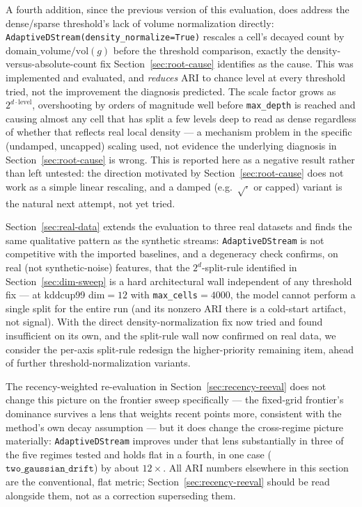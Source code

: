\documentclass[11pt]{article}
\begin{document}
A fourth addition, since the previous version of this evaluation, does address the dense/sparse threshold's lack of volume normalization directly: \texttt{AdaptiveDStream(density\_normalize=True)} rescales a cell's decayed count by \(\text{domain\_volume}/\text{vol}(g)\) before the threshold comparison, exactly the density-versus-absolute-count fix Section~\ref{sec:root-cause} identifies as the cause. This was implemented and evaluated, and \emph{reduces} ARI to chance level at every threshold tried, not the improvement the diagnosis predicted. The scale factor grows as \(2^{d \cdot \text{level}}\), overshooting by orders of magnitude well before \texttt{max\_depth} is reached and causing almost any cell that has split a few levels deep to read as dense regardless of whether that reflects real local density — a mechanism problem in the specific (undamped, uncapped) scaling used, not evidence the underlying diagnosis in Section~\ref{sec:root-cause} is wrong. This is reported here as a negative result rather than left untested: the direction motivated by Section~\ref{sec:root-cause} does not work as a simple linear rescaling, and a damped (e.g.\ \(\sqrt{\cdot}\) or capped) variant is the natural next attempt, not yet tried.

Section~\ref{sec:real-data} extends the evaluation to three real datasets and finds the same qualitative pattern as the synthetic streams: \texttt{AdaptiveDStream} is not competitive with the imported baselines, and a degeneracy check confirms, on real (not synthetic-noise) features, that the \(2^d\)-split-rule identified in Section~\ref{sec:dim-sweep} is a hard architectural wall independent of any threshold fix — at kddcup99 dim$=12$ with \texttt{max\_cells}$=4000$, the model cannot perform a single split for the entire run (and its nonzero ARI there is a cold-start artifact, not signal). With the direct density-normalization fix now tried and found insufficient on its own, and the split-rule wall now confirmed on real data, we consider the per-axis split-rule redesign the higher-priority remaining item, ahead of further threshold-normalization variants.

The recency-weighted re-evaluation in Section~\ref{sec:recency-reeval} does not change this picture on the frontier sweep specifically — the fixed-grid frontier's dominance survives a lens that weights recent points more, consistent with the method's own decay assumption — but it does change the cross-regime picture materially: \texttt{AdaptiveDStream} improves under that lens substantially in three of the five regimes tested and holds flat in a fourth, in one case ($\texttt{two\_gaussian\_drift}$) by about $12\times$. All ARI numbers elsewhere in this section are the conventional, flat metric; Section~\ref{sec:recency-reeval} should be read alongside them, not as a correction superseding them.
\end{document}
